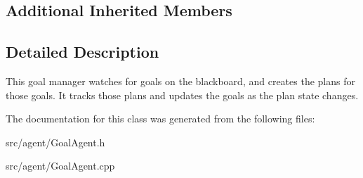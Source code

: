 \subsection*{Additional Inherited Members}


\subsection{Detailed Description}
This goal manager watches for goals on the blackboard, and creates the plans for those goals. It tracks those plans and updates the goals as the plan state changes. 

The documentation for this class was generated from the following files\+:\begin{DoxyCompactItemize}
\item 
src/agent/Goal\+Agent.\+h\item 
src/agent/Goal\+Agent.\+cpp\end{DoxyCompactItemize}
